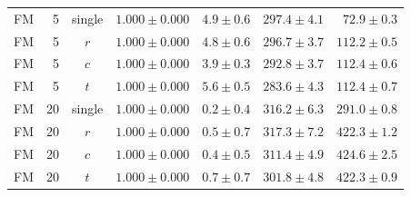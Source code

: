 \begin{table}[htpb]
\begin{tabularx}{\linewidth}{@{}L r c rrrr@{}}
    \addlinespace[2pt]
    FM & 5 & single & $1.000 \pm 0.000$ & $4.9 \pm 0.6$ & $297.4 \pm 4.1$ & $72.9 \pm 0.3$ \\
    FM & 5 & $r$ & $1.000 \pm 0.000$ & $4.8 \pm 0.6$ & $296.7 \pm 3.7$ & $112.2 \pm 0.5$ \\
    FM & 5 & $c$ & $1.000 \pm 0.000$ & $3.9 \pm 0.3$ & $292.8 \pm 3.7$ & $112.4 \pm 0.6$ \\
    FM & 5 & $t$ & $1.000 \pm 0.000$ & $5.6 \pm 0.5$ & $283.6 \pm 4.3$ & $112.4 \pm 0.7$ \\
    \addlinespace[2pt]
    FM & 20 & single & $1.000 \pm 0.000$ & $0.2 \pm 0.4$ & $316.2 \pm 6.3$ & $291.0 \pm 0.8$ \\
    FM & 20 & $r$ & $1.000 \pm 0.000$ & $0.5 \pm 0.7$ & $317.3 \pm 7.2$ & $422.3 \pm 1.2$ \\
    FM & 20 & $c$ & $1.000 \pm 0.000$ & $0.4 \pm 0.5$ & $311.4 \pm 4.9$ & $424.6 \pm 2.5$ \\
    FM & 20 & $t$ & $1.000 \pm 0.000$ & $0.7 \pm 0.7$ & $301.8 \pm 4.8$ & $422.3 \pm 0.9$ \\
    \bottomrule
  \end{tabularx}
\end{table}

\FloatBarrier
